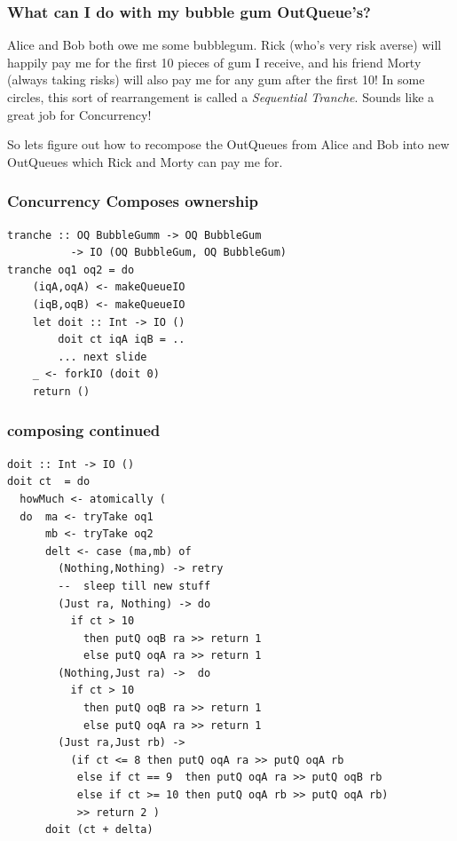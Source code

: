 \documentclass[11pt,reqno]{beamer}
\begin{document}
\begin{frame}
  \frametitle{What can I do with my bubble gum OutQueue's?}
Alice and Bob both owe me some bubblegum. Rick (who's very risk averse) will happily pay me
for the first 10 pieces of gum I receive, and his friend Morty (always taking risks) will
also pay me for any gum after the first 10! In some circles, this sort of rearrangement
is called a \emph{Sequential Tranche}. Sounds like a great job for Concurrency!


So lets figure out how to recompose the OutQueues from Alice and Bob into new
OutQueues which Rick and Morty can pay me for.

\end{frame}

\begin{frame}[fragile]\frametitle{Concurrency Composes ownership}
\begin{verbatim}
tranche :: OQ BubbleGumm -> OQ BubbleGum
          -> IO (OQ BubbleGum, OQ BubbleGum)
tranche oq1 oq2 = do
    (iqA,oqA) <- makeQueueIO
    (iqB,oqB) <- makeQueueIO
    let doit :: Int -> IO ()
        doit ct iqA iqB = ..
        ... next slide
    _ <- forkIO (doit 0)
    return ()
\end{verbatim}
\end{frame}

\begin{frame}[fragile]\frametitle{composing continued}
    \begin{verbatim}
doit :: Int -> IO ()
doit ct  = do
  howMuch <- atomically (
  do  ma <- tryTake oq1
      mb <- tryTake oq2
      delt <- case (ma,mb) of
        (Nothing,Nothing) -> retry
        --  sleep till new stuff
        (Just ra, Nothing) -> do
          if ct > 10
            then putQ oqB ra >> return 1
            else putQ oqA ra >> return 1
        (Nothing,Just ra) ->  do
          if ct > 10
            then putQ oqB ra >> return 1
            else putQ oqA ra >> return 1
        (Just ra,Just rb) ->
          (if ct <= 8 then putQ oqA ra >> putQ oqA rb
           else if ct == 9  then putQ oqA ra >> putQ oqB rb
           else if ct >= 10 then putQ oqA rb >> putQ oqA rb)
           >> return 2 )
      doit (ct + delta)


    \end{verbatim}


\end{frame}

\end{document}
